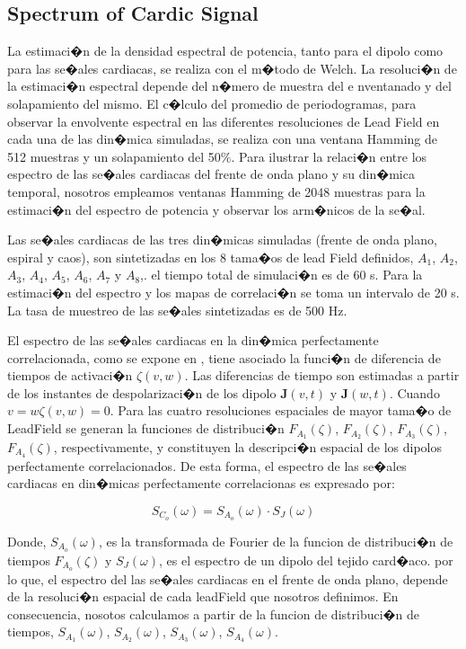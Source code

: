 \subsection{Spectrum of Cardic Signal}

La estimaci�n de la densidad espectral de potencia,   tanto para el  dipolo como
para las se�ales cardiacas,  se realiza con el m�todo de Welch.  La resoluci�n
de la estimaci�n espectral depende  del  n�mero de muestra del  e nventanado y
del solapamiento del mismo. El c�lculo del promedio de periodogramas,  para
observar la  envolvente espectral en las diferentes resoluciones  de Lead Field 
en cada una de las din�mica simuladas, se realiza con una ventana  Hamming de
512  muestras y un solapamiento del 50\%. Para ilustrar la  relaci�n entre los  
espectro de las se�ales cardiacas del frente de onda plano y su din�mica 
temporal,  nosotros empleamos ventanas Hamming de 2048 muestras para la
estimaci�n del  espectro de potencia  y observar los arm�nicos de la se�al.

Las se�ales cardiacas de las tres din�micas simuladas (frente de onda plano, 
espiral y caos), son sintetizadas en los 8 tama�os de lead Field definidos, 
$A_1$, $A_2$, $A_3$, $A_4$, $A_5$, $A_6$, $A_7$ y $A_8$,. el tiempo total  de 
simulaci�n es de 60 s. Para la estimaci�n del espectro  y  los mapas de
correlaci�n  se toma un intervalo de 20 s. La  tasa de muestreo de las se�ales  
sintetizadas es de 500 Hz.

El espectro de las se�ales cardiacas  en la din�mica perfectamente correlacionada, como se expone en \cite{RequenaSpectral1}, tiene asociado la funci�n de diferencia de tiempos de activaci�n ${\zeta}(v,w)$. Las diferencias de  tiempo son estimadas a partir de los instantes de  despolarizaci�n  de los  dipolo $\mathbf{J}(v,t)$ y $\mathbf{J}(w,t)$.  Cuando $v=w  { \zeta}(v,w)=0$. Para  las cuatro resoluciones espaciales de mayor tama�o de LeadField  se generan la funciones de distribuci�n $F_{A_1}(\zeta)$, $F_{A_2}(\zeta)$, $F_{A_3}(\zeta)$, $F_{A_4}(\zeta)$, respectivamente, y constituyen la descripci�n espacial de los dipolos perfectamente correlacionados.  De esta forma, el espectro  de las se�ales cardiacas en din�micas perfectamente correlacionas es expresado por:

\begin{equation}
S_{C_o}(\omega)=S_{A_o}(\omega) \cdot  S_{J}(\omega)
\end{equation}

Donde, $S_{A_o}(\omega)$, es la transformada de  Fourier de la funcion de distribuci�n de  tiempos  $F_{A_o}(\zeta)$ y $S_{J}(\omega)$, es el espectro de un  dipolo del  tejido card�aco. por lo que, el espectro del las  se�ales cardiacas en el frente de onda plano, depende de la resoluci�n espacial de cada leadField que nosotros definimos. En consecuencia, nosotos calculamos a partir de la funcion de distribuci�n de  tiempos, $S_{A_1}(\omega)$, $S_{A_2}(\omega)$, $S_{A_3}(\omega)$, $S_{A_4}(\omega)$.



